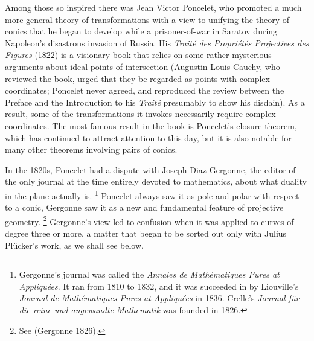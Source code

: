 Among those so inspired there was Jean Victor Poncelet,
%
 who promoted
%
a much more general theory of transformations with a view to unifying
the theory of conics that he began to develop while a prisoner-of-war
in Saratov during Napoleon's disastrous invasion of Russia. His
\emph{Trait\'e des Propri\'et\'es Projectives des Figures} (1822) is a
visionary book that relies on some rather mysterious arguments about ideal
points of intersection (Augustin-Louis Cauchy,
%
 who reviewed the book,
urged that they be regarded as points with complex coordinates;
%
 Poncelet
never agreed, and reproduced the review between the Preface and the
Introduction to his \emph{Trait\'e}  presumably to show his disdain). As
a result, some of the transformations it invokes necessarily require
complex coordinates. The most famous result in the book is Poncelet's
closure theorem,
%
 which has continued to attract attention to this day,
but it is also notable for many other theorems involving pairs of conics.


In the 1820s, Poncelet had a dispute with Joseph Diaz Gergonne,
%
 the editor
of the only journal at the time entirely devoted to mathematics, about
what duality in the plane actually is.%
%
\footnote{Gergonne's journal was
called the \emph{Annales de Math\'ematiques Pures at Appliqu\'ees}. It ran
%
from 1810 to 1832, and  it was succeeded in by Liouville's
%
\emph{Journal
%
de Math\'ematiques Pures at Appliqu\'ees} in 1836. Crelle's
%
\emph{Journal
%
f\"ur die reine und angewandte Mathematik} was founded in 1826.}
%
Poncelet always saw it as pole and polar with respect to a conic,
Gergonne saw it as a new and fundamental feature of projective
%
geometry.%
%
\footnote{See (Gergonne 1826).} 
%
Gergonne's view led to confusion
when it was applied to curves of degree three or more, a matter that began
to be sorted out only with Julius Pl\"ucker's work, as we shall see below.


